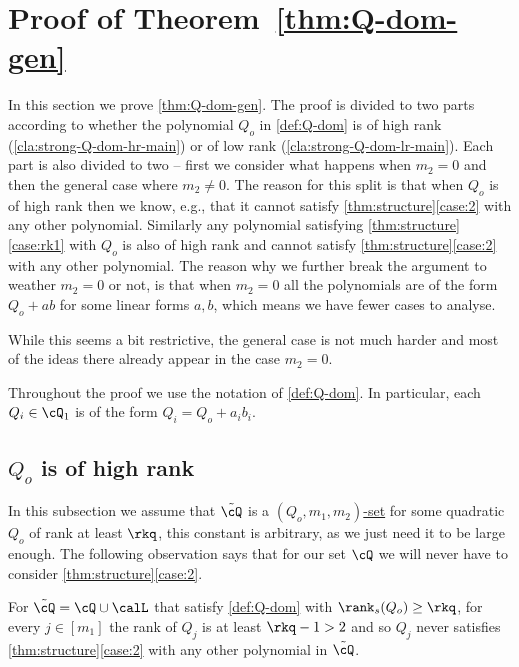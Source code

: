 \section{Proof of Theorem~\ref{thm:Q-dom-gen}}\label{sec:q-dom}

In this section we prove \autoref{thm:Q-dom-gen}. The proof is divided to two parts according to whether the polynomial $Q_o$ in \autoref{def:Q-dom} is of high rank (\autoref{cla:strong-Q-dom-hr-main}) or of low rank (\autoref{cla:strong-Q-dom-lr-main}). Each part is also divided to two -- first we consider what happens when $m_2=0$ and then the general case where $m_2\neq 0$. The reason for this split is that when $Q_o$ is of high rank then we know, e.g., that it cannot satisfy \autoref{thm:structure}\ref{case:2} with any other polynomial. Similarly any polynomial satisfying \autoref{thm:structure}\ref{case:rk1} with $Q_o$ is also of high rank and cannot satisfy \autoref{thm:structure}\ref{case:2} with any other polynomial. The reason why we further break the argument to weather $m_2=0$ or not, is that when $m_2= 0$ all the polynomials  are of the form $Q_o+ab$ for some linear forms $a,b$, which means we have fewer cases to analyse.

While this seems a bit restrictive, the general case is not much harder and most of the ideas there already appear in the case $m_2=0$. 


Throughout the proof we use the notation of \autoref{def:Q-dom}. In particular, each $Q_i\in\cQ_1$ is of the form $Q_i=Q_o+a_ib_i$.





\subsection{$Q_o$ is of high rank}

In this subsection we assume that $\tilde{\cQ}$ is a \hyperref[def:Q-dom]{$(Q_o,m_1,m_2)$-set} for some quadratic $Q_o$ of rank at least $\rkq$, this constant is arbitrary, as we just need it to be large enough.
The following observation says that for our set $\cQ$ we will never have to consider 
\autoref{thm:structure}\ref{case:2}. 

\begin{observation}\label{obs:case3}
For $\tilde{\cQ} = \cQ \cup \calL$ that satisfy \autoref{def:Q-dom} with $\rank_s(Q_o)\geq \rkq$, for every $j \in [m_1]$ the rank of $Q_j$ is at least $\rkq-1>2$ and so $Q_j$ never satisfies \autoref{thm:structure}\ref{case:2} with any other polynomial in $\tilde{\cQ}$.

\end{observation}

